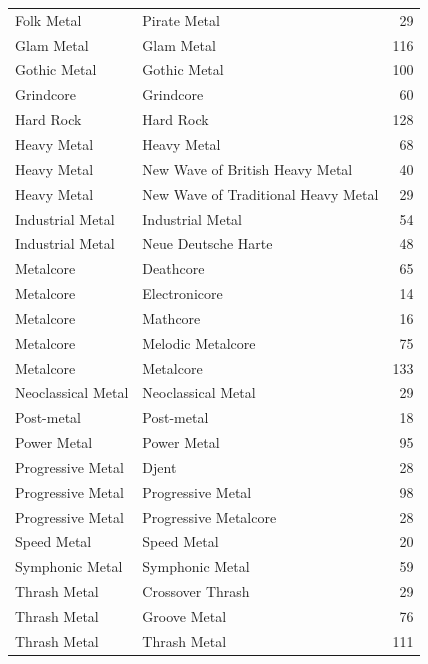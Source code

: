 \begin{longtable}{llr}
Folk Metal & Pirate Metal & 29 \\
Glam Metal & Glam Metal & 116 \\
Gothic Metal & Gothic Metal & 100 \\
Grindcore & Grindcore & 60 \\
Hard Rock & Hard Rock & 128 \\
Heavy Metal & Heavy Metal & 68 \\
Heavy Metal & New Wave of British Heavy Metal & 40 \\
Heavy Metal & New Wave of Traditional Heavy Metal & 29 \\
Industrial Metal & Industrial Metal & 54 \\
Industrial Metal & Neue Deutsche Harte & 48 \\
Metalcore & Deathcore & 65 \\
Metalcore & Electronicore & 14 \\
Metalcore & Mathcore & 16 \\
Metalcore & Melodic Metalcore & 75 \\
Metalcore & Metalcore & 133 \\
Neoclassical Metal & Neoclassical Metal & 29 \\
Post-metal & Post-metal & 18 \\
Power Metal & Power Metal & 95 \\
Progressive Metal & Djent & 28 \\
Progressive Metal & Progressive Metal & 98 \\
Progressive Metal & Progressive Metalcore & 28 \\
Speed Metal & Speed Metal & 20 \\
Symphonic Metal & Symphonic Metal & 59 \\
Thrash Metal & Crossover Thrash & 29 \\
Thrash Metal & Groove Metal & 76 \\
Thrash Metal & Thrash Metal & 111 \\
\end{longtable}
